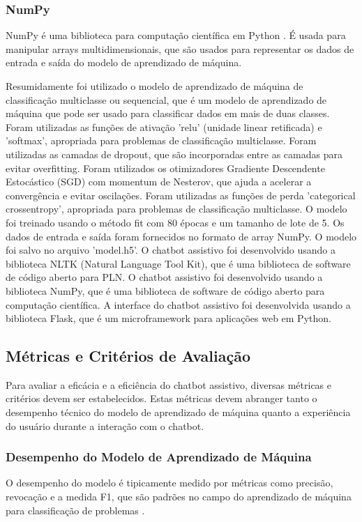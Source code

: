 \documentclass[conference]{IEEEtran}
\begin{document}
\subsubsection{NumPy}
NumPy é uma biblioteca para computação científica em Python \cite{Harris2020}.
É usada para manipular arrays multidimensionais,
que são usados para representar os dados de entrada e saída do modelo de aprendizado de máquina.


Resumidamente foi utilizado o modelo de aprendizado de máquina de classificação multiclasse ou sequencial, que é um modelo
de aprendizado de máquina que pode ser usado para classificar dados em mais de duas classes.
Foram utilizadas as funções de ativação 'relu' (unidade linear retificada) e 'softmax', apropriada para problemas de classificação multiclasse.
Foram utilizadas as camadas de dropout, que são incorporadas entre as camadas para evitar overfitting.
Foram utilizados os otimizadores Gradiente Descendente Estocástico (SGD) com momentum de Nesterov, que ajuda a acelerar a convergência e evitar oscilações.
Foram utilizadas as funções de perda 'categorical crossentropy', apropriada para problemas de classificação multiclasse.
O modelo foi treinado usando o método fit com 80 épocas e um tamanho de lote de 5.
Os dados de entrada e saída foram fornecidos no formato de array NumPy.
O modelo foi salvo no arquivo 'model.h5'.
O chatbot assistivo foi desenvolvido usando a biblioteca NLTK (Natural Language Tool Kit), que é uma biblioteca de software
de código aberto para PLN. 
O chatbot assistivo foi desenvolvido usando a biblioteca NumPy, que é uma biblioteca de software
de código aberto para computação científica.
A interface do chatbot assistivo foi desenvolvida usando a biblioteca Flask, 
que é um microframework para aplicações web em Python.


\subsection{Métricas e Critérios de Avaliação}

Para avaliar a eficácia e a eficiência do chatbot assistivo, diversas métricas e critérios devem ser estabelecidos. 
Estas métricas devem abranger tanto o desempenho técnico do modelo de aprendizado de máquina 
quanto a experiência do usuário durante a interação com o chatbot.

\subsubsection{Desempenho do Modelo de Aprendizado de Máquina}
O desempenho do modelo é tipicamente medido por métricas como precisão, revocação e a medida F1, 
que são padrões no campo do aprendizado de máquina para classificação de problemas \cite{Sokolova2009}.
\end{document}
